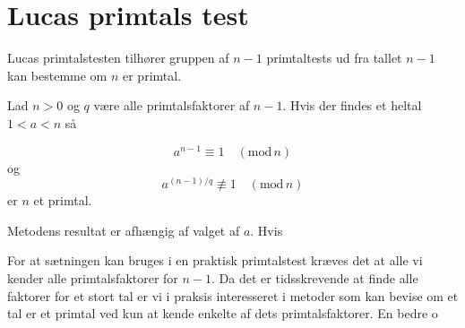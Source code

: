 \section{Lucas primtals test}
Lucas primtalstesten tilhører gruppen af $n-1$ primtaltests ud fra
tallet $n-1$ kan bestemme om $n$ er primtal.

\begin{theorem}
  Lad $n > 0$ og $q$ være alle primtalsfaktorer af $n - 1$. Hvis der 
  findes et heltal $1 < a < n$ så

\begin{equation}
a^{n-1}\equiv 1 \quad (\text{mod}\,n)
\end{equation}
og
\begin{equation}
a^{(n-1)/q} \not\equiv 1\quad (\text{mod}\,n)
\end{equation}
er $n$ et primtal.

\end{theorem}

Metodens resultat er afhængig af valget af $a$. Hvis 

For at sætningen kan bruges i en praktisk primtalstest kræves det at
alle vi kender alle primtalsfaktorer for $n - 1$. Da det er
tidsskrevende at finde alle faktorer for et stort tal er vi i praksis
interesseret i metoder som kan bevise om et tal er et primtal ved kun
at kende enkelte af dets primtalsfaktorer. En bedre 
o